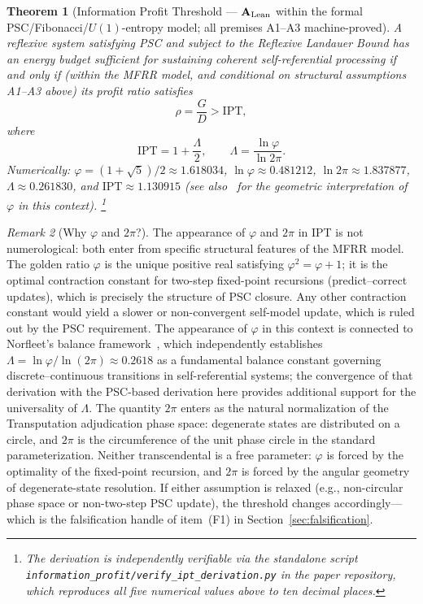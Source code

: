 \documentclass[11pt,twocolumn]{article}
\newcommand{\CatAL}{\ensuremath{\textbf{A}_{\rm Lean}}}
\newtheorem{theorem}{Theorem}[section]
\theoremstyle{remark}
\newtheorem{remark}[theorem]{Remark}
\begin{document}
\begin{theorem}[Information Profit Threshold --- \textup{$\CatAL$ within the formal PSC/Fibonacci/$U(1)$-entropy model; all premises A1--A3 machine-proved}]
\label{thm:ipt}
A reflexive system satisfying PSC and subject to the Reflexive Landauer
Bound has an energy budget sufficient for sustaining coherent
self-referential processing if and only if (within the MFRR model,
and conditional on structural assumptions A1--A3 above)
its profit ratio satisfies
\[
  \rho = \frac{G}{D} > \mathrm{IPT},
\]
where
\begin{equation}
  \label{eq:ipt}
  \boxed{\mathrm{IPT} = 1 + \frac{\Lambda}{2},
  \qquad \Lambda = \frac{\ln\varphi}{\ln 2\pi}.}
\end{equation}
Numerically: $\varphi = (1+\sqrt{5})/2 \approx 1.618034$,
$\ln\varphi \approx 0.481212$, $\ln 2\pi \approx 1.837877$,
$\Lambda \approx 0.261830$, and $\mathrm{IPT} \approx 1.130915$
(see also~\cite{NorfleetPrivComm} for the geometric
interpretation of $\varphi$ in this context).%
\footnote{The derivation is independently verifiable via the standalone script
\texttt{information\_profit/verify\_ipt\_derivation.py} in the paper repository,
which reproduces all five numerical values above to ten decimal places.}
\end{theorem}

\begin{remark}[Why $\varphi$ and $2\pi$?]
\label{rem:transcendentals}
The appearance of $\varphi$ and $2\pi$ in IPT is not numerological: both
enter from specific structural features of the MFRR model. The golden ratio
$\varphi$ is the unique positive real satisfying $\varphi^2 = \varphi + 1$;
it is the optimal contraction constant for two-step fixed-point recursions
(predict--correct updates), which is precisely the structure of PSC closure.
Any other contraction constant would yield a slower or non-convergent
self-model update, which is ruled out by the PSC requirement. The appearance
of $\varphi$ in this context is connected to Norfleet's balance
framework~\cite{NorfleetPrivComm}, which independently establishes
$\Lambda = \ln\varphi/\ln(2\pi) \approx 0.2618$ as a fundamental balance
constant governing discrete--continuous transitions in self-referential
systems; the convergence of that derivation with the PSC-based derivation
here provides additional support for the universality of $\Lambda$.
The quantity $2\pi$ enters as the natural normalization of the Transputation adjudication phase
space: degenerate states are distributed on a circle, and $2\pi$ is the
circumference of the unit phase circle in the standard parameterization.
Neither transcendental is a free parameter: $\varphi$ is forced by the
optimality of the fixed-point recursion, and $2\pi$ is forced by the
angular geometry of degenerate-state resolution. If either assumption is
relaxed (e.g., non-circular phase space or non-two-step PSC update), the
threshold changes accordingly---which is the falsification handle of
item~(F1) in Section~\ref{sec:falsification}.
\end{remark}
\end{document}
